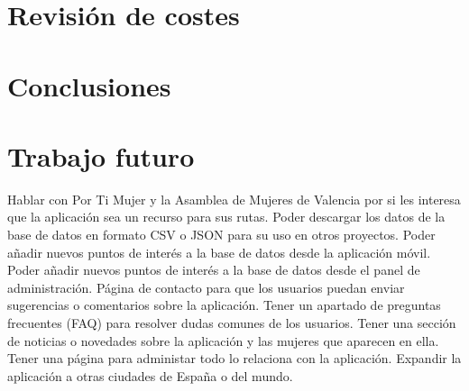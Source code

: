 
\section{Revisión de costes}

\section{Conclusiones}

\section{Trabajo futuro}
Hablar con Por Ti Mujer y la Asamblea de Mujeres de Valencia por si les interesa que la aplicación sea un recurso para sus rutas.
Poder descargar los datos de la base de datos en formato CSV o JSON para su uso en otros proyectos.
Poder añadir nuevos puntos de interés a la base de datos desde la aplicación móvil.
Poder añadir nuevos puntos de interés a la base de datos desde el panel de administración.
Página de contacto para que los usuarios puedan enviar sugerencias o comentarios sobre la aplicación.
Tener un apartado de preguntas frecuentes (FAQ) para resolver dudas comunes de los usuarios.
Tener una sección de noticias o novedades sobre la aplicación y las mujeres que aparecen en ella.
Tener una página para administar todo lo relaciona con la aplicación.
Expandir la aplicación a otras ciudades de España o del mundo.
